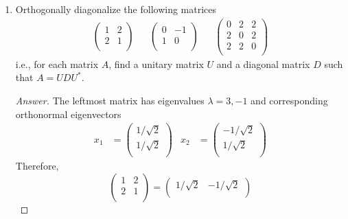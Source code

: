 \documentclass[../psets.tex]{subfiles}
\begin{document}
\begin{enumerate}[label={\textbf{6.\arabic*.}}]
    \item Orthogonally diagonalize the following matrices
    \begin{align*}
        \begin{pmatrix}
            1 & 2\\
            2 & 1\\
        \end{pmatrix}&&
        \begin{pmatrix}
            0 & -1\\
            1 & 0\\
        \end{pmatrix}&&
        \begin{pmatrix}
            0 & 2 & 2\\
            2 & 0 & 2\\
            2 & 2 & 0\\
        \end{pmatrix}
    \end{align*}
    i.e., for each matrix $A$, find a unitary matrix $U$ and a diagonal matrix $D$ such that $A=UDU^*$.
    \begin{proof}[Answer]
        The leftmost matrix has eigenvalues $\lambda=3,-1$ and corresponding orthonormal eigenvectors
        \begin{align*}
            x_1 &=
            \begin{pmatrix}
                1/\sqrt{2}\\
                1/\sqrt{2}\\
            \end{pmatrix}&
            x_2 &=
            \begin{pmatrix}
                -1/\sqrt{2}\\
                1/\sqrt{2}\\
            \end{pmatrix}
        \end{align*}
        Therefore,
        \begin{equation*}
            \begin{pmatrix}
                1 & 2\\
                2 & 1\\
            \end{pmatrix}
            =
            \begin{pmatrix}
                1/\sqrt{2} & -1/\sqrt{2}\\

\end{pmatrix}
\end{equation*}
\end{proof}
\end{enumerate}
\end{document}
